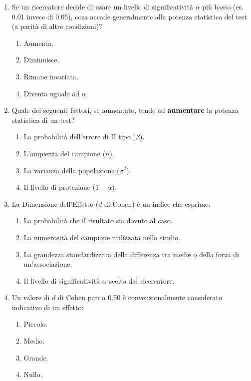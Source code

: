 \documentclass[12pt, a4paper]{article}
\newcommand{\alphaerr}{\alpha} %
\newcommand{\betaerr}{\beta}  %
\newcommand{\cohend}{d} %
\begin{document}
\begin{enumerate}
    \item Se un ricercatore decide di usare un livello di significatività $\alphaerr$ più basso (es. 0.01 invece di 0.05), cosa accade generalmente alla potenza statistica del test (a parità di altre condizioni)?
    \begin{enumerate}
        \item Aumenta.
        \item Diminuisce.
        \item Rimane invariata.
        \item Diventa uguale ad $\alphaerr$.
    \end{enumerate}

    \item Quale dei seguenti fattori, se aumentato, tende ad \textbf{aumentare} la potenza statistica di un test?
    \begin{enumerate}
        \item La probabilità dell'errore di II tipo ($\betaerr$).
        \item L'ampiezza del campione ($n$).
        \item La varianza della popolazione ($\sigma^2$).
        \item Il livello di protezione ($1-\alphaerr$).
    \end{enumerate}

    \item La Dimensione dell'Effetto ($\cohend$ di Cohen) è un indice che esprime:
    \begin{enumerate}
        \item La probabilità che il risultato sia dovuto al caso.
        \item La numerosità del campione utilizzata nello studio.
        \item La grandezza standardizzata della differenza tra medie o della forza di un'associazione.
        \item Il livello di significatività $\alphaerr$ scelto dal ricercatore.
    \end{enumerate}

    \item Un valore di $\cohend$ di Cohen pari a 0.50 è convenzionalmente considerato indicativo di un effetto:
    \begin{enumerate}
        \item Piccolo.
        \item Medio.
        \item Grande.
        \item Nullo.
    \end{enumerate}


\end{enumerate}
\end{document}
